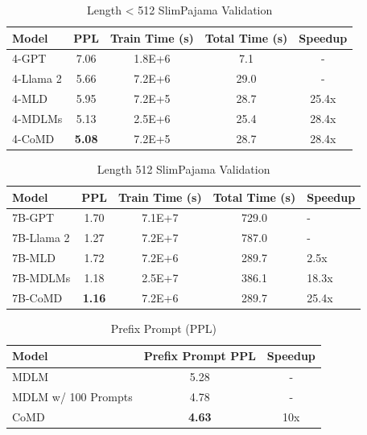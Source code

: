 \begin{table}[!ht]
    \centering
    \caption{Length < 512 SlimPajama Validation}
    \label{table:llm-test}
    
    \begin{tabular}{l c c c c} 
        \toprule
        \textbf{Model} & \textbf{PPL} & \textbf{Train Time (s)} & \textbf{Total Time (s)} & \textbf{Speedup} \\ 
        \midrule
        4-GPT \citep{kitouni2024factorization} & 7.06 & 1.8E+6 & 7.1 & - \\ 
        4-Llama 2 \citep{touvron2023llama2} & 5.66 & 7.2E+6 & 29.0 & -  \\ 
        4-MLD \citep{austin2023structured} &  5.95 & 7.2E+5 & 28.7 & 25.4x  \\ 
        4-MDLMs \citep{shih2022training}  & 5.13 & 2.5E+6 & 25.4 & 28.4x \\ 
        4-CoMD   & \textbf{5.08} & 7.2E+5 & 28.7 & 28.4x \\ 
        \bottomrule
    \end{tabular}
\end{table}

\begin{table}[!ht]
    \centering
    \caption{Length 512 SlimPajama Validation}
    \label{table:llm-test-llama}
    
    \begin{tabular}{l c c c} 
        \toprule
        \textbf{Model} & \textbf{PPL} & \textbf{Train Time (s)} & \textbf{Total Time (s)} & \textbf{Speedup} \\ 
        \midrule
        7B-GPT \citep{touvron2023llama2} & 1.70 & 7.1E+7 & 729.0 & -  \\ 
        7B-Llama 2 \citep{touvron2023llama2} & 1.27 & 7.2E+7 & 787.0 & -  \\ 
        7B-MLD \citep{austin2023structured} & 1.72 & 7.2E+6 & 289.7 & 2.5x  \\ 
        7B-MDLMs \citep{shih2022training}  & 1.18 & 2.5E+7 & 386.1 & 18.3x \\ 
        7B-CoMD   & \textbf{1.16} & 7.2E+6 & 289.7 & 25.4x \\ 
        \bottomrule
    \end{tabular}
\end{table}

\begin{table}[!ht]
    \centering
    \caption{Prefix Prompt (PPL)}
    \label{table:prompt}
    
    \begin{tabular}{l c c} 
        \toprule
        \textbf{Model} & \textbf{Prefix Prompt PPL} & \textbf{Speedup} \\ 
        \midrule
        MDLM \citep{shih2022training}   & 5.28 & -  \\ 
        MDLM w/ 100 Prompts \citep{shih2022training}   & 4.78 & -  \\ 
        CoMD   & \textbf{4.63} & 10x \\ 
        \bottomrule
    \end{tabular}
\end{table}

